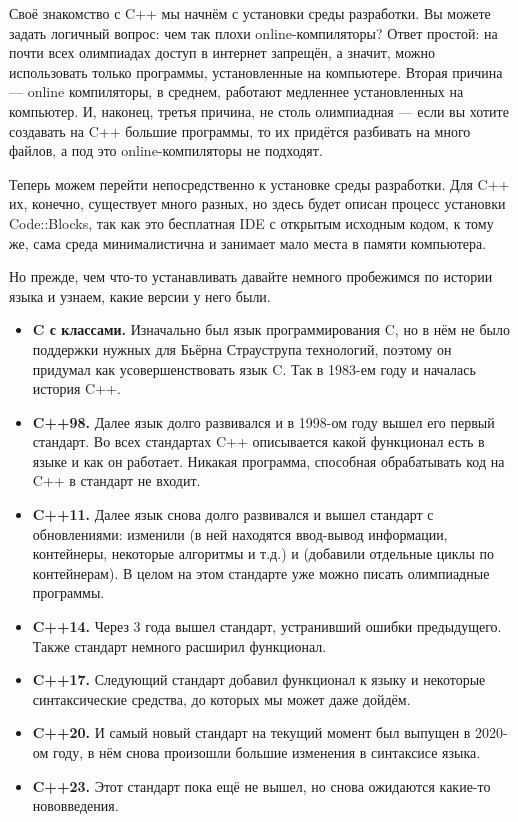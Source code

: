 Своё знакомство с C++ мы начнём с установки среды разработки. Вы можете задать логичный вопрос: чем так плохи online-компиляторы? Ответ простой: на почти всех олимпиадах доступ в интернет запрещён, а значит, можно использовать только программы, установленные на компьютере. Вторая причина — online компиляторы, в среднем, работают медленнее установленных на компьютер. И, наконец, третья причина, не столь олимпиадная — если вы хотите создавать на C++ большие программы, то их придётся разбивать на много файлов, а под это online-компиляторы не подходят.

Теперь можем перейти непосредственно к установке среды разработки. Для C++ их, конечно, существует много разных, но здесь будет описан процесс установки Code::Blocks, так как это бесплатная IDE с открытым исходным кодом, к тому же, сама среда минималистична и занимает мало места в памяти компьютера.

Но прежде, чем что-то устанавливать давайте немного пробежимся по истории языка и узнаем, какие версии у него были. 

\begin{itemize}
    \item \textbf{C с классами.} Изначально был язык программирования C, но в нём не было поддержки нужных для Бьёрна Страуструпа технологий, поэтому он придумал как усовершенствовать язык C. Так в 1983-ем году и началась история C++.
    \item \textbf{C++98.} Далее язык долго развивался и в 1998-ом году вышел его первый стандарт. Во всех стандартах C++ описывается какой функционал есть в языке и как он работает. Никакая программа, способная обрабатывать код на C++ в стандарт не входит.
    \item \textbf{C++11.} Далее язык снова долго развивался и вышел стандарт с обновлениями: изменили  (в ней находятся ввод-вывод информации, контейнеры, некоторые алгоритмы и т.д.) и  (добавили отдельные циклы по контейнерам). В целом на этом стандарте уже можно писать олимпиадные программы.
    \item \textbf{C++14.} Через 3 года вышел стандарт, устранивший ошибки предыдущего. Также стандарт немного расширил функционал.
    \item \textbf{C++17.} Следующий стандарт добавил функционал к языку и некоторые синтаксические средства, до которых мы может даже дойдём.
    \item \textbf{C++20.} И самый новый стандарт на текущий момент был выпущен в 2020-ом году, в нём снова произошли большие изменения в синтаксисе языка.
    \item \textbf{C++23.} Этот стандарт пока ещё не вышел, но снова ожидаются какие-то нововведения.
\end{itemize}

